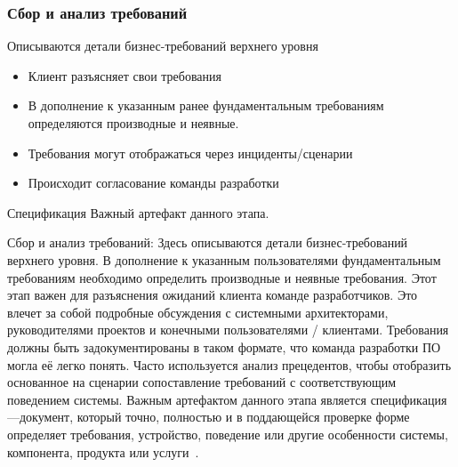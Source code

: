 \documentclass{../industrial-development}
\begin{document}
\begin{frame} \frametitle{Сбор и анализ требований}
Описываются детали бизнес-требований верхнего уровня
\begin{itemize}
  \item Клиент разъясняет свои требования
	\item В дополнение к указанным ранее фундаментальным требованиям определяются \alert{производные и неявные}.
	\item Требования могут отображаться через инциденты/сценарии
	\item Происходит согласование команды разработки
\end{itemize}
\begin{block}{Спецификация}
Важный артефакт данного этапа. 
\end{block}
\end{frame}
\lecturenotes
Сбор и анализ требований:
Здесь описываются детали бизнес-требований верхнего уровня. В дополнение к указанным пользователями фундаментальным требованиям необходимо  определить производные и неявные требования. Этот этап важен для разъяснения ожиданий клиента команде разработчиков. Это влечет за собой подробные обсуждения с системными архитекторами, руководителями проектов и конечными пользователями / клиентами. Требования должны быть задокументированы в таком формате, что команда разработки ПО могла её легко понять. Часто используется анализ прецедентов, чтобы отобразить основанное на сценарии сопоставление требований с соответствующим поведением системы.  Важным артефактом данного этапа является спецификация---документ, который точно, полностью и в поддающейся проверке форме определяет требования, устройство, поведение или другие особенности системы, компонента, продукта или услуги~\cite{SDLC}.
\end{document}
